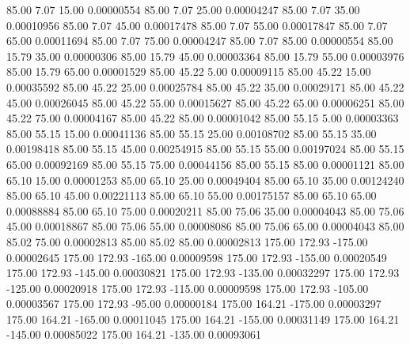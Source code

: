      85.00      7.07     15.00     0.00000554
     85.00      7.07     25.00     0.00004247
     85.00      7.07     35.00     0.00010956
     85.00      7.07     45.00     0.00017478
     85.00      7.07     55.00     0.00017847
     85.00      7.07     65.00     0.00011694
     85.00      7.07     75.00     0.00004247
     85.00      7.07     85.00     0.00000554
     85.00     15.79     35.00     0.00000306
     85.00     15.79     45.00     0.00003364
     85.00     15.79     55.00     0.00003976
     85.00     15.79     65.00     0.00001529
     85.00     45.22      5.00     0.00009115
     85.00     45.22     15.00     0.00035592
     85.00     45.22     25.00     0.00025784
     85.00     45.22     35.00     0.00029171
     85.00     45.22     45.00     0.00026045
     85.00     45.22     55.00     0.00015627
     85.00     45.22     65.00     0.00006251
     85.00     45.22     75.00     0.00004167
     85.00     45.22     85.00     0.00001042
     85.00     55.15      5.00     0.00003363
     85.00     55.15     15.00     0.00041136
     85.00     55.15     25.00     0.00108702
     85.00     55.15     35.00     0.00198418
     85.00     55.15     45.00     0.00254915
     85.00     55.15     55.00     0.00197024
     85.00     55.15     65.00     0.00092169
     85.00     55.15     75.00     0.00044156
     85.00     55.15     85.00     0.00001121
     85.00     65.10     15.00     0.00001253
     85.00     65.10     25.00     0.00049404
     85.00     65.10     35.00     0.00124240
     85.00     65.10     45.00     0.00221113
     85.00     65.10     55.00     0.00175157
     85.00     65.10     65.00     0.00088884
     85.00     65.10     75.00     0.00020211
     85.00     75.06     35.00     0.00004043
     85.00     75.06     45.00     0.00018867
     85.00     75.06     55.00     0.00008086
     85.00     75.06     65.00     0.00004043
     85.00     85.02     75.00     0.00002813
     85.00     85.02     85.00     0.00002813
    175.00    172.93   -175.00     0.00002645
    175.00    172.93   -165.00     0.00009598
    175.00    172.93   -155.00     0.00020549
    175.00    172.93   -145.00     0.00030821
    175.00    172.93   -135.00     0.00032297
    175.00    172.93   -125.00     0.00020918
    175.00    172.93   -115.00     0.00009598
    175.00    172.93   -105.00     0.00003567
    175.00    172.93    -95.00     0.00000184
    175.00    164.21   -175.00     0.00003297
    175.00    164.21   -165.00     0.00011045
    175.00    164.21   -155.00     0.00031149
    175.00    164.21   -145.00     0.00085022
    175.00    164.21   -135.00     0.00093061
